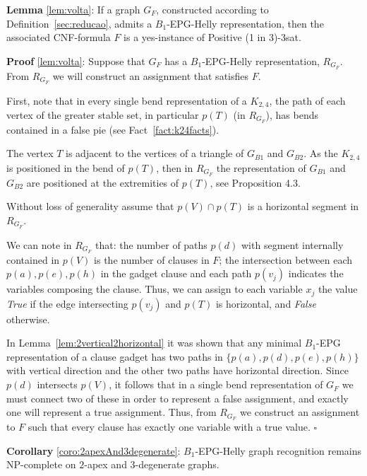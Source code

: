 \documentclass[9pt]{entcs}
\begin{document}
\begin{lema*}\textbf{Lemma} \ref{lem:volta}:
If a graph $G_F$, constructed according to Definition~\ref{sec:reducao}, admits a $B_1$-EPG-Helly representation, then the associated CNF-formula $F$ is a yes-instance of {\sc Positive (1 in 3)-3sat}.
\end{lema*}

\begin{prove*}\textbf{Proof} \ref{lem:volta}:
Suppose that $G_F$ has a $B_1$-EPG-Helly representation, $R_{G_F}$.  From $R_{G_F}$ we will construct an assignment that satisfies $F$. 

First, note that in every single bend representation of a $K_{2,4}$, the path of each vertex of the greater stable set, in particular $p(T)$ (in $R_{G_F}$), has bends contained in a false pie (see Fact~\ref{fact:k24facts}). 


The vertex $T$ is adjacent to the vertices of a triangle of $G_{B1}$ and $G_{B2}$. As the $K_{2,4}$ is positioned in the bend of $p(T)$, then in $R_{G_F}$ the representation of $G_{B1}$ and $G_{B2}$ are positioned at the extremities of $p(T)$, see Proposition 4.3. %


Without loss of generality assume that $p(V) \cap p(T)$ is a horizontal segment in $R_{G_F}$.

We can note in $R_{G_F}$ that: the number of paths $p(d)$ with segment internally contained in $p(V)$ is the number of clauses in $F$; the intersection between each $p(a), p(e), p(h)$ in the gadget clause and each path $p(v_j)$ indicates the variables composing the clause. Thus, we can assign to each variable $ x_{j}$ the value \textit{True} if the edge intersecting $p(v_j)$ and $p(T)$ is horizontal, and \textit{False} otherwise. 


In Lemma~\ref{lem:2vertical2horizontal} it was shown that any minimal $B_1$-EPG representation of a clause gadget has two paths in $\{p(a), p(d), p(e), p(h)\}$ with vertical direction and the other two paths have horizontal direction. Since $p(d)$ intersects $p(V)$, it follows that in a single bend representation of $G_F$ we must connect two of these in order to represent a false assignment, and exactly one will represent a true assignment. Thus, from $R_{G_F}$ we construct an assignment to $F$ such that every clause has exactly one variable with a true value.  
$\square$ \end{prove*}

\begin{coro*}\textbf{Corollary} \ref{coro:2apexAnd3degenerate}:
{\sc $B_{1}$-EPG-Helly graph recognition} remains NP-complete on $2$-apex and $3$-degenerate graphs.
\end{coro*}
\end{document}
